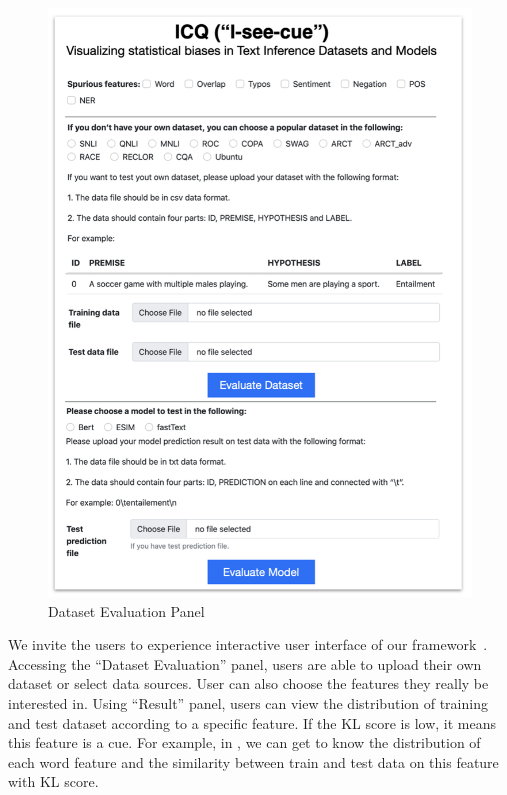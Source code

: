 \begin{figure}[th]
\centering
\includegraphics[width=1.0\columnwidth]{picture/dataset.jpg}
\caption{Dataset Evaluation Panel}
\label{fig:dataset}
\end{figure}

We invite the users to experience interactive user interface of our 
framework~. Accessing the ``Dataset Evaluation''
panel, users are able to upload their own dataset or select data sources. 
User can also choose the features they really be interested in.
Using  ``Result'' panel, users can view the distribution of training and test dataset 
according to a specific feature. If the KL score is low, it means this feature is a cue. 
For example, in , we can get to know the distribution of 
each word feature and the similarity between train and test data on this feature with 
KL score.

